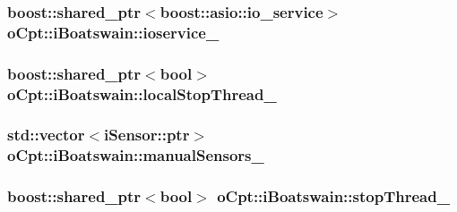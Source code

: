 \subsubsection[{\texorpdfstring{ioservice\+\_\+}{ioservice_}}]{\setlength{\rightskip}{0pt plus 5cm}boost\+::shared\+\_\+ptr$<$boost\+::asio\+::io\+\_\+service$>$ o\+Cpt\+::i\+Boatswain\+::ioservice\+\_\+\hspace{0.3cm}{\ttfamily [protected]}}\hypertarget{classo_cpt_1_1i_boatswain_a95b337b39962f9c63fd82b500351a960}{}\label{classo_cpt_1_1i_boatswain_a95b337b39962f9c63fd82b500351a960}
\subsubsection[{\texorpdfstring{local\+Stop\+Thread\+\_\+}{localStopThread_}}]{\setlength{\rightskip}{0pt plus 5cm}boost\+::shared\+\_\+ptr$<$bool$>$ o\+Cpt\+::i\+Boatswain\+::local\+Stop\+Thread\+\_\+\hspace{0.3cm}{\ttfamily [protected]}}\hypertarget{classo_cpt_1_1i_boatswain_a38228671875f0c0ed945d2f44422d649}{}\label{classo_cpt_1_1i_boatswain_a38228671875f0c0ed945d2f44422d649}
\subsubsection[{\texorpdfstring{manual\+Sensors\+\_\+}{manualSensors_}}]{\setlength{\rightskip}{0pt plus 5cm}std\+::vector$<${\bf i\+Sensor\+::ptr}$>$ o\+Cpt\+::i\+Boatswain\+::manual\+Sensors\+\_\+\hspace{0.3cm}{\ttfamily [protected]}}\hypertarget{classo_cpt_1_1i_boatswain_a1b58c7613d0dae24536f2db2e0510799}{}\label{classo_cpt_1_1i_boatswain_a1b58c7613d0dae24536f2db2e0510799}
\subsubsection[{\texorpdfstring{stop\+Thread\+\_\+}{stopThread_}}]{\setlength{\rightskip}{0pt plus 5cm}boost\+::shared\+\_\+ptr$<$bool$>$ o\+Cpt\+::i\+Boatswain\+::stop\+Thread\+\_\+\hspace{0.3cm}{\ttfamily [protected]}}\hypertarget{classo_cpt_1_1i_boatswain_a2fd1fb91df1788bb070ff4e7b7cf2c15}{}\label{classo_cpt_1_1i_boatswain_a2fd1fb91df1788bb070ff4e7b7cf2c15}
